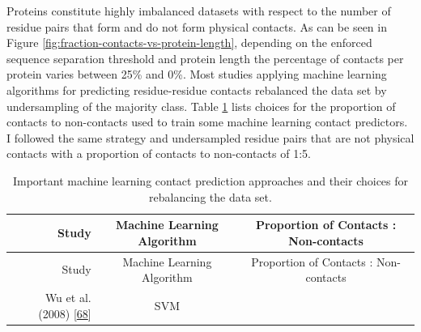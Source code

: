 \documentclass[11pt,a4paper,twoside]{book}
\theoremstyle{definition}
\theoremstyle{definition}
\theoremstyle{remark}
\begin{document}
Proteins constitute highly imbalanced datasets with respect to the
number of residue pairs that form and do not form physical contacts. As
can be seen in Figure \ref{fig:fraction-contacts-vs-protein-length},
depending on the enforced sequence separation threshold and protein
length the percentage of contacts per protein varies between 25\% and
0\%. Most studies applying machine learning algorithms for predicting
residue-residue contacts rebalanced the data set by undersampling of the
majority class. Table \ref{tab:rebalancing-dataset} lists choices for
the proportion of contacts to non-contacts used to train some machine
learning contact predictors. I followed the same strategy and
undersampled residue pairs that are not physical contacts with a
proportion of contacts to non-contacts of 1:5.

\begin{longtable}[]{@{}rcc@{}}
\caption{\label{tab:rebalancing-dataset} Important machine learning contact
prediction approaches and their choices for rebalancing the data
set.}\tabularnewline
\toprule
\begin{minipage}[b]{0.32\columnwidth}\raggedleft\strut
Study\strut
\end{minipage} & \begin{minipage}[b]{0.19\columnwidth}\centering\strut
Machine Learning Algorithm\strut
\end{minipage} & \begin{minipage}[b]{0.29\columnwidth}\centering\strut
Proportion of Contacts : Non-contacts\strut
\end{minipage}\tabularnewline
\midrule
\endfirsthead
\toprule
\begin{minipage}[b]{0.32\columnwidth}\raggedleft\strut
Study\strut
\end{minipage} & \begin{minipage}[b]{0.19\columnwidth}\centering\strut
Machine Learning Algorithm\strut
\end{minipage} & \begin{minipage}[b]{0.29\columnwidth}\centering\strut
Proportion of Contacts : Non-contacts\strut
\end{minipage}\tabularnewline
\midrule
\endhead
\begin{minipage}[t]{0.32\columnwidth}\raggedleft\strut
Wu et al. (2008) {[}\protect\hyperlink{ref-Wu2008}{68}{]}\strut
\end{minipage} & \begin{minipage}[t]{0.19\columnwidth}\centering\strut
SVM\strut
\end{minipage} & \begin{minipage}[t]{0.29\columnwidth}\centering\strut

\end{minipage}
\end{longtable}
\end{document}
